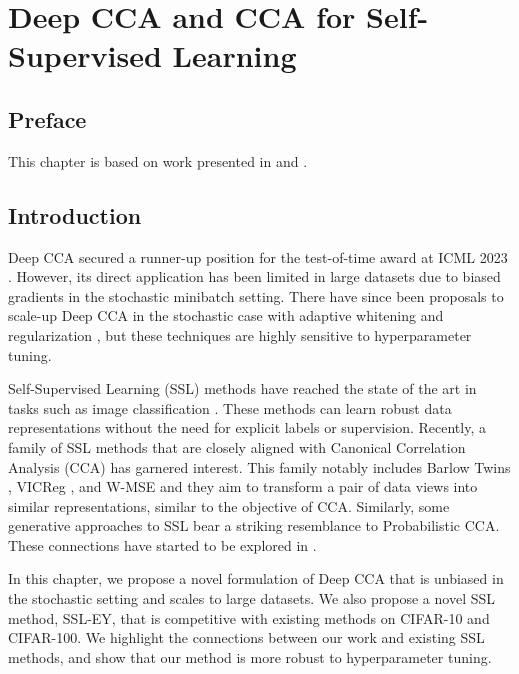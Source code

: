 \graphicspath{{chapters/deep_learning/}}


\chapter{Deep CCA and CCA for Self-Supervised Learning}\label{chap:deep_learning}
\minitoc
\section*{Preface}

This chapter is based on work presented in \citet{chapman2023cca} and \citet{chapman2023efficient}.

\section{Introduction}

Deep CCA \citep{andrew2013deep} secured a runner-up position for the test-of-time award at ICML 2023 \citep{ICML2023TOT}. However, its direct application has been limited in large datasets due to biased gradients in the stochastic minibatch setting.
There have since been proposals to scale-up Deep CCA in the stochastic case with adaptive whitening \cite{wang2015stochastic} and regularization \cite{chang2018scalable}, but these techniques are highly sensitive to hyperparameter tuning.

Self-Supervised Learning (SSL) methods have reached the state of the art in tasks such as image classification \citep{balestriero2023cookbook}. These methods can learn robust data representations without the need for explicit labels or supervision. Recently, a family of SSL methods that are closely aligned with Canonical Correlation Analysis (CCA) has garnered interest. This family notably includes Barlow Twins \citep{zbontar2021barlow}, VICReg \citep{bardes2021vicreg}, and W-MSE \citep{ermolov2021whitening} and they aim to transform a pair of data views into similar representations, similar to the objective of CCA. Similarly, some generative approaches to SSL\cite{sansone2022gedi} bear a striking resemblance to Probabilistic CCA\cite{bach2005probabilistic}. These connections have started to be explored in \cite{balestriero2022contrastive}.

In this chapter, we propose a novel formulation of Deep CCA that is unbiased in the stochastic setting and scales to large datasets. We also propose a novel SSL method, SSL-EY, that is competitive with existing methods on CIFAR-10 and CIFAR-100. We highlight the connections between our work and existing SSL methods, and show that our method is more robust to hyperparameter tuning.

